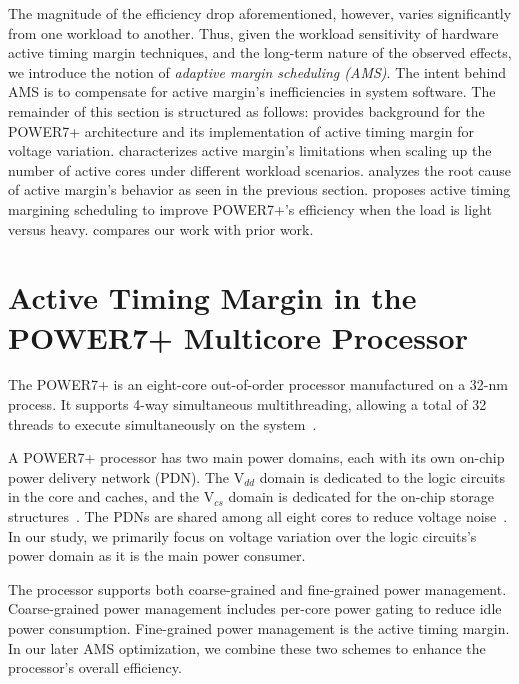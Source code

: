The magnitude of the efficiency drop aforementioned, however, varies significantly from one workload to another. Thus, given the workload sensitivity of hardware active timing margin techniques, and the long-term nature of the observed effects, we introduce the notion of \emph{adaptive margin scheduling (AMS)}. The intent behind AMS is to compensate for active margin's inefficiencies in system software. The remainder of this section is structured as follows:  provides background for the POWER7+ architecture and its implementation of active timing margin for voltage variation.  characterizes active margin's limitations when scaling up the number of active cores under different workload scenarios.  analyzes the root cause of active margin's behavior as seen in the previous section.  proposes active timing margining scheduling to improve POWER7+'s efficiency when the load is light versus heavy.  compares our work with prior work.

\section{Active Timing Margin in the POWER7+ Multicore Processor}
\label{sec:voltage:background}
The POWER7+ is an eight-core out-of-order processor manufactured on a 32-nm process. It supports 4-way simultaneous multithreading, allowing a total of 32 threads to execute simultaneously on the system~\cite{manousopoulos2012characterizing}.

A POWER7+ processor has two main power domains, each with its own on-chip power delivery network (PDN). The V$_{dd}$ domain is dedicated to the logic circuits in the core and caches, and the V$_{cs}$ domain is dedicated for the on-chip storage structures~\cite{zyuban2013ibm,barth201045nm}. The PDNs are shared among all eight cores to reduce voltage noise~\cite{james2007comparison}. In our study, we primarily focus on voltage variation over the logic circuits's power domain as it is the main power consumer.

The processor supports both coarse-grained and fine-grained power management. Coarse-grained power management includes per-core power gating to reduce idle power consumption. Fine-grained power management is the active timing margin. In our later AMS optimization, we combine these two schemes to enhance the processor's overall efficiency.

